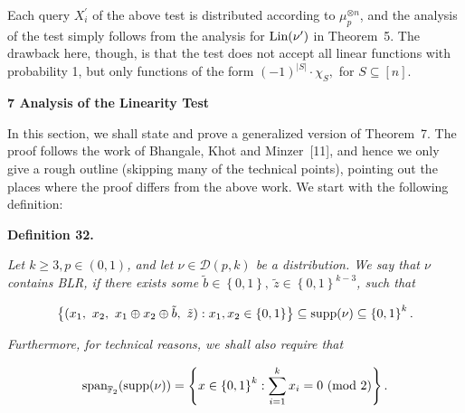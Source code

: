 \documentclass[10pt,a4paper]{article}
\begin{document}
Each query $X_{i}^{\prime}$ of the above test is distributed according to $\mu_{p}^{\otimes n}$, and the analysis of the test simply follows from the analysis for $\textnormal{Lin}(\nu^{\prime})$ in Theorem 5.
The drawback here, though, is that the test does not accept all linear functions with probability 1, but only functions of the form $(-1)^{\left|S\right|}\cdot\chi_{S},$ for $S\subseteq[n]$.\par







\par\medskip\noindent\textbf{
7 Analysis of the Linearity Test}\par




In this section, we shall state and prove a generalized version of Theorem 7.
The proof follows the work of Bhangale, Khot and Minzer [11], and hence we only give a rough outline (skipping many of the technical points), pointing out the places where the proof differs from the above work.
We start with the following definition:\par





\par\medskip\noindent\textbf{
\textbf{Definition 32}\textbf{.}
}\par



\emph{Let $k\geqslant 3,p\in(0,1)$, and let $\nu\in\mathcal{D}(p,k)$ be a distribution.
We say that $\nu$ contains BLR, if there exists some $\tilde{b}\in\left\{0,1\right\},\ \tilde{z}\in\left\{0,1\right\}^{k-3}$, such that}\par


\[\begin{gathered}
\left\{(x_{1},\ x_{2},\ x_{1}\oplus x_{2}\oplus\tilde{b},\ \tilde{z}):x_{1},x_{2}\in\left\{0,1\right\}\right\}\subseteq\textnormal{supp}(\nu)\subseteq\left\{0,1\right\}^{k}.
\end{gathered}\]


\emph{Furthermore, for technical reasons, we shall also require that}\par


\[\begin{gathered}
\textnormal{span}_{\mathbb{F}_{2}}(\textnormal{supp}(\nu))=\left\{x\in\left\{0,1\right\}^{k}:\sum_{i=1}^{k}x_{i}=0\textnormal{ (mod 2)}\right\}.
\end{gathered}\]
\end{document}
